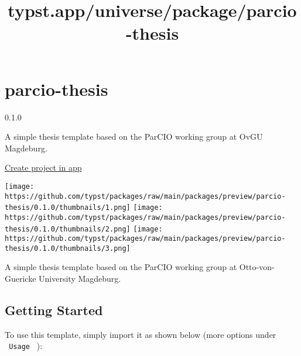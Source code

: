 \title{typst.app/universe/package/parcio-thesis}

\label{banner}
\label{template-thumbnail}

\section{parcio-thesis}\label{parcio-thesis}

{ 0.1.0 }

A simple thesis template based on the ParCIO working group at OvGU
Magdeburg.

\href{/app?template=parcio-thesis&version=0.1.0}{Create project in app}

\label{readme}
\texttt{[image: https://github.com/typst/packages/raw/main/packages/preview/parcio-thesis/0.1.0/thumbnails/1.png]}
\texttt{[image: https://github.com/typst/packages/raw/main/packages/preview/parcio-thesis/0.1.0/thumbnails/2.png]}
\texttt{[image: https://github.com/typst/packages/raw/main/packages/preview/parcio-thesis/0.1.0/thumbnails/3.png]}

A simple thesis template based on the ParCIO working group at
Otto-von-Guericke University Magdeburg.

\subsection{Getting Started}\label{getting-started}

To use this template, simply import it as shown below (more options
under \texttt{\ Usage\ } ):

\begin{Shaded}
\begin{Highlighting}[]

\NormalTok{  ),}
\NormalTok{)}
\end{Highlighting}
\end{Shaded}

